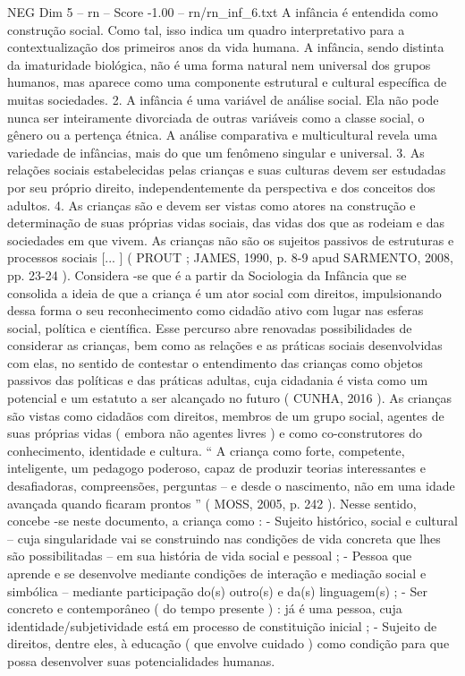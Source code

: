 \begin{textsample}{NEG Dim 5 – rn – Score -1.00 – rn/rn\_inf\_6.txt}
A infância é entendida como construção social.
Como tal, isso indica um quadro interpretativo para a contextualização dos primeiros anos da vida humana.
A infância, sendo distinta da imaturidade biológica, não é uma forma natural nem universal dos grupos humanos, mas aparece como uma componente estrutural e cultural específica de muitas sociedades. 2.
A infância é uma variável de análise social.
Ela não pode nunca ser inteiramente divorciada de outras variáveis como a classe social, o gênero ou a pertença étnica.
A análise comparativa e multicultural revela uma variedade de infâncias, mais do que um fenômeno singular e universal. 3.
As relações sociais estabelecidas pelas crianças e suas culturas devem ser estudadas por seu próprio direito, independentemente da perspectiva e dos conceitos dos adultos. 4.
As crianças são e devem ser vistas como atores na construção e determinação de suas próprias vidas sociais, das vidas dos que as rodeiam e das sociedades em que vivem.
As crianças não são os sujeitos passivos de estruturas e processos sociais [... ] ( PROUT ; JAMES, 1990, p. 8-9 apud SARMENTO, 2008, pp. 23-24 ).
Considera -se que é a partir da Sociologia da Infância que se consolida a ideia de que a criança é um ator social com direitos, impulsionando dessa forma o seu reconhecimento como cidadão ativo com lugar nas esferas social, política e científica.
Esse percurso abre renovadas possibilidades de considerar as crianças, bem como as relações e as práticas sociais desenvolvidas com elas, no sentido de contestar o entendimento das crianças como objetos passivos das políticas e das práticas adultas, cuja cidadania é vista como um potencial e um estatuto a ser alcançado no futuro ( CUNHA, 2016 ).
As crianças são vistas como cidadãos com direitos, membros de um grupo social, agentes de suas próprias vidas ( embora não agentes livres ) e como co-construtores do conhecimento, identidade e cultura. “ A criança como forte, competente, inteligente, um pedagogo poderoso, capaz de produzir teorias interessantes e desafiadoras, compreensões, perguntas – e desde o nascimento, não em uma idade avançada quando ficaram prontos ” ( MOSS, 2005, p. 242 ).
Nesse sentido, concebe -se neste documento, a criança como : - Sujeito histórico, social e cultural – cuja singularidade vai se construindo nas condições de vida concreta que lhes são possibilitadas – em sua história de vida social e pessoal ; - Pessoa que aprende e se desenvolve mediante condições de interação e mediação social e simbólica – mediante participação do(s) outro(s) e da(s) linguagem(s) ; - Ser concreto e contemporâneo ( do tempo presente ) : já é uma pessoa, cuja identidade/subjetividade está em processo de constituição inicial ; - Sujeito de direitos, dentre eles, à educação ( que envolve cuidado ) como condição para que possa desenvolver suas potencialidades humanas.

\end{textsample}
